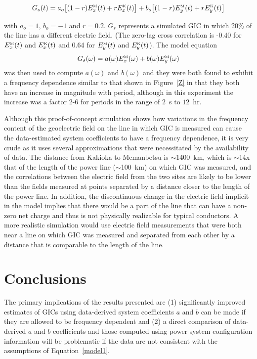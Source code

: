 \documentclass[draft,linenumbers]{agujournal2018}
\begin{document}
\begin{equation}
G_s(t)=a_o\big[(1-r)E^{\mbox{\tiny M}}_x(t) + rE^{\mbox{\tiny K}}_x(t)\big]+b_o\big[(1-r)E^{\mbox{\tiny M}}_y(t) + rE^{\mbox{\tiny K}}_y(t)\big]
\end{equation}

\noindent
with $a_o=1$, $b_o=-1$ and $r=0.2$. $G_s$ represents a simulated GIC in which 20\% of the line has a different electric field. (The zero-lag cross correlation is -0.40 for $E^{\mbox{\tiny M}}_x(t)$ and $E^{\mbox{\tiny K}}_x(t)$ and 0.64 for $E^{\mbox{\tiny M}}_y(t)$ and $E^{\mbox{\tiny K}}_y(t)$). The model equation
\begin{equation}
G_s(\omega)=a(\omega)E^{\mbox{\tiny M}}_x(\omega)+b(\omega)E^{\mbox{\tiny M}}_y(\omega)
\end{equation}
\noindent
was then used to compute $a(\omega)$ and $b(\omega)$ and they were both found to exhibit a frequency dependence similar to that shown in Figure~\ref{Z} in that they both have an increase in magnitude with period, although in this experiment the increase was a factor 2-6 for periods in the range of $2$~s to $12$~hr.

Although this proof-of-concept simulation shows how variations in the frequency content of the geoelectric field on the line in which GIC is measured can cause the data-estimated system coefficients to have a frequency dependence, it is very crude as it uses several approximations that were necessitated by the availability of data. The distance from Kakioka to Memanbetsu is $\sim$1400~km, which is $\sim$14x that of the length of the power line ($\sim$100~km) on which GIC was measured, and the correlations between the electric field from the two sites are likely to be lower than the fields measured at points separated by a distance closer to the length of the power line. In addition, the discontinuous change in the electric field implicit in the model implies that there would be a part of the line that can have a non-zero net charge and thus is not physically realizable for typical conductors. A more realistic simulation would use electric field measurements that were both near a line on which GIC was measured and separated from each other by a distance that is comparable to the length of the line.

\section{Conclusions}

The primary implications of the results presented are (1) significantly improved estimates of GICs using data-derived system coefficients $a$ and $b$ can be made if they are allowed to be frequency dependent and (2) a direct comparison of data-derived $a$ and $b$ coefficients and those computed using power system configuration information will be problematic if the data are not consistent with the assumptions of Equation~\ref{model1}. 
\end{document}
